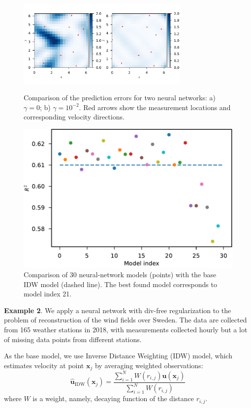 \documentclass[pamm,a4paper,fleqn]{w-art}
\renewcommand{\vec}[1]{\boldsymbol{#1}}
\begin{document}
\begin{figure}
\begin{minipage}{0.48\textwidth}
  \includegraphics[width=3.3in]{assets/error-fields-comparison.pdf}
  \caption{Comparison of the prediction errors for two neural networks:
    a) $\gamma=0$; b) $\gamma=10^{-2}$.
    Red arrows show the measurement locations and corresponding
  velocity directions.}%
  \label{fig:tg2d}
\end{minipage}
\hfill
\begin{minipage}{0.48\textwidth}
  \centering
  \includegraphics[scale=0.42]{assets/r2-vs-model.pdf}
  \caption{Comparison of 30 neural-network models (points)
    with the base IDW model (dashed line).
  The best found model corresponds to model index 21.}%
  \label{fig:r2-vs-model}
\end{minipage}
\end{figure}

\textbf{Example 2}.
We apply a neural network with div-free regularization to the problem of
reconstruction of the wind fields over Sweden.
The data are collected from 165 weather stations in 2018, with measurements
collected hourly but a lot of missing data points from different stations.

As the base model, we use Inverse Distance Weighting (IDW) model, which
estimates velocity at point $\vec x_j$ by averaging weighted observations:
\begin{equation}
  \label{eq:base-model}
  \hat{\vec u}_{\text{IDW}}(\vec x_j) =
  \frac{\sum_{i=1}^N W(r_{i,j}) \vec u(\vec x_j)}{\sum_{i=1}^N W(r_{i,j})}
\end{equation}
where $W$ is a weight, namely, decaying function of the distance $r_{i, j}$.
\end{document}

